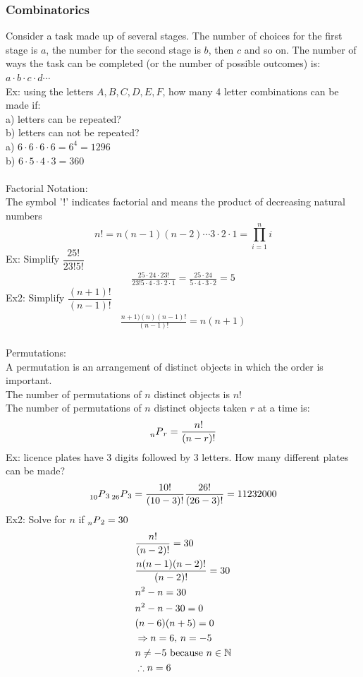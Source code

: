 \documentclass[11pt, fleqn]{article}
\begin{document}
\subsubsection{Combinatorics}
Consider a task made up of several stages. The number of choices for the first stage is $a$, the number for the second stage is $b$, then $c$ and so on. The number of ways the task can be completed (or the number of possible outcomes) is: $a\cdot b\cdot c\cdot d\cdots$\\
Ex: using the letters $A, B, C,D,E,F$, how many 4 letter combinations can be made if:\\
a) letters can be repeated?\\
b) letters can not be repeated?\\
a) $6\cdot6\cdot6\cdot6=6^4=1296$\\
b) $6\cdot5\cdot4\cdot3=360$\\
\\
Factorial Notation:\\
The symbol '!' indicates factorial and means the product of decreasing natural numbers
$$n!=n(n-1)(n-2)\cdots3\cdot2\cdot1=\prod_{i=1}^ni$$
Ex: Simplify $\dfrac{25!}{23!5!}$
\begin{align*}
    \frac{25\cdot24\cdot23!}{23!5\cdot4\cdot3\cdot2\cdot1}=\frac{25\cdot24}{5\cdot4\cdot3\cdot2}=5
\end{align*}
Ex2: Simplify $\dfrac{(n+1)!}{(n-1)!}$
\begin{align*}
    \frac{n+1)(n)(n-1)!}{(n-1)!}=n(n+1)
\end{align*}
\\
Permutations:\\
A permutation is an arrangement of distinct objects in which the order is important.\\
The number of permutations of $n$ distinct objects is $n!$\\
The number of permutations of $n$ distinct objects taken $r$ at a time is:
$$\prescript{}{n}{P}_r=\frac{n!}{(n-r)!}$$
Ex: licence plates have 3 digits followed by 3 letters. How many different plates can be made?\\
\begin{align*}
    \prescript{}{10}{P}_{3}\prescript{}{26}{P}_{3}=\frac{10!}{(10-3)!}\frac{26!}{(26-3)!}=11232000
\end{align*}
Ex2: Solve for $n$ if $\prescript{}{n}{P}_{2}=30$
\begin{align*}
    &\frac{n!}{(n-2)!}=30\\
    &\frac{n(n-1)(n-2)!}{(n-2)!}=30\\
    &n^2-n=30\\
    &n^2-n-30=0\\
    &(n-6)(n+5)=0\\
    &\Rightarrow n=6,\,n=-5\\
    &n\neq-5\text{ because }n\in\mathbb{N}\\
    &\therefore n=6
\end{align*}
\end{document}
